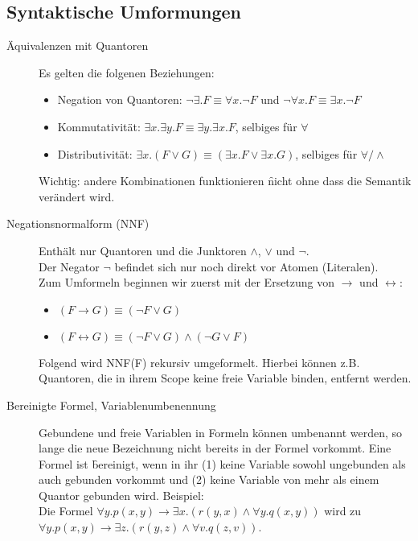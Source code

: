 \subsection{Syntaktische Umformungen}
    \begin{description}
        \item[Äquivalenzen mit Quantoren ] Es gelten die folgenen Beziehungen:
            \begin{itemize}
                \item Negation von Quantoren: $\neg\exists.F \equiv \forall x.\neg F$ und $\neg\forall x.F \equiv \exists x.\neg F$
                \item Kommutativität: $\exists x. \exists y.F \equiv \exists y. \exists x.F$, selbiges für $\forall${}
                \item Distributivität: $\exists x.(F \lor G) \equiv (\exists x.F \lor \exists x.G)$, selbiges für $\forall / \land$
            \end{itemize}
            Wichtig: andere Kombinationen funktionieren \f{nicht} ohne dass die Semantik verändert wird.

        \item[Negationsnormalform (NNF)] Enthält nur Quantoren und die Junktoren $\land$, $\lor$ und $\neg$. \\
            Der Negator $\neg$ befindet sich nur noch direkt vor Atomen (Literalen). \\
            Zum Umformeln beginnen wir zuerst mit der Ersetzung von $\to$ und $\leftrightarrow$:{}
            \begin{itemize}
                \item $(F \to G) \equiv (\neg F \lor G)$
                \item $(F \leftrightarrow G) \equiv (\neg F \lor G) \land (\neg G \lor F)$
            \end{itemize}
            Folgend wird NNF(F) rekursiv umgeformelt. Hierbei können z.B. Quantoren, die in ihrem Scope keine freie Variable binden, entfernt werden.

        \item[Bereinigte Formel, Variablenumbenennung] Gebundene und freie Variablen in Formeln können umbenannt werden, so lange die neue Bezeichnung nicht bereits in der Formel vorkommt. Eine Formel ist \f{bereinigt}, wenn in ihr (1) keine Variable sowohl ungebunden als auch gebunden vorkommt und (2) keine Variable von mehr als einem Quantor gebunden wird. Beispiel: \\
            Die Formel $\forall y.p(x,y) \to \exists x.(r(y,x) \land \forall y.q(x,y))$ wird zu $\forall y.p(x,y) \to \exists z.(r(y,z) \land \forall v.q(z,v))$.


\end{description}

